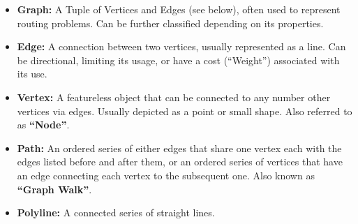 \documentclass[11pt,a4paper]{vutinfth}
\begin{document}
\begin{itemize}
 \item \textbf{Graph:} A Tuple of Vertices and Edges (see below), often used to represent routing problems. Can be further classified depending on its properties.
 \item \textbf{Edge:} A connection between two vertices, usually represented as a line. Can be directional, limiting its usage, or have a cost (``Weight'') associated with its use.
 \item \textbf{Vertex:} A featureless object that can be connected to any number other vertices via edges. Usually depicted as a point or small shape. Also referred to as \textbf{``Node''}.%
 \item \textbf{Path:} An ordered series of either edges that share one vertex each with the edges listed before and after them, or an ordered series of vertices that have an edge connecting each vertex to the subsequent one. Also known as \textbf{``Graph Walk''}.
 
 \item \textbf{Polyline:} A connected series of straight lines.%
 

\end{itemize}
\end{document}
